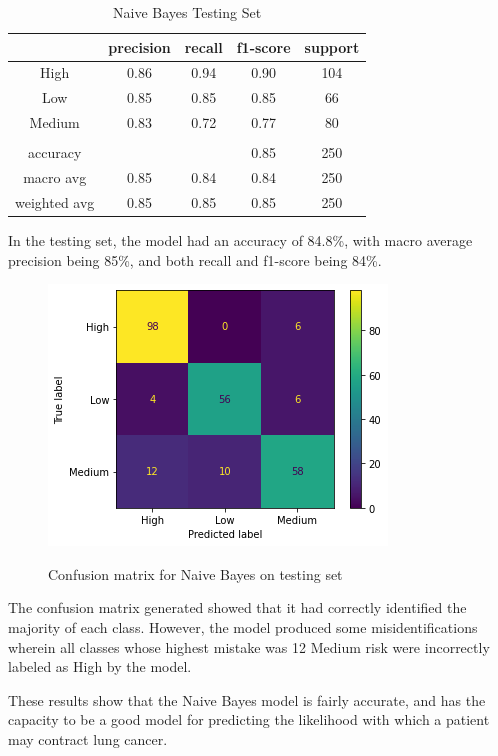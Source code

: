 \documentclass[runningheads]{llncs}
\begin{document}
\begin{table}[ht]
\centering
\caption{Naive Bayes Testing Set} \vspace{0.25em}
\begin{tabular}{|c|c|c|c|c|} \hline
 & precision & recall & f1-score & support \\ \hline
High   & 0.86 & 0.94 & 0.90 & 104 \\ \hline
Low    & 0.85 & 0.85 & 0.85 & 66 \\ \hline
Medium & 0.83 & 0.72 & 0.77 & 80 \\ \hline
& & & & \\ \hline
accuracy     & & & 0.85 & 250 \\ \hline
macro avg    & 0.85 & 0.84 & 0.84 & 250 \\ \hline
weighted avg & 0.85 & 0.85 & 0.85 & 250 \\ \hline
\end{tabular}
\label{tab:naivebayes-testing}
\end{table}

In the testing set, the model had an accuracy of 84.8\%, with macro average precision being 85\%, and both recall and f1-score being 84\%.

\begin{figure}[ht]           	 
\centering               	 
\caption{Confusion matrix for Naive Bayes on testing set}
\includegraphics[scale=0.5]{naivebayes-CM-testing.png}  	 
\label{fig:naivebayes-CM-testing}
\end{figure}

The confusion matrix generated showed that it had correctly identified the majority of each class. However, the model produced some misidentifications wherein all classes whose highest mistake was 12 Medium risk were incorrectly labeled as High by the model. 

These results show that the Naive Bayes model is fairly accurate, and has the capacity to be a good model for predicting the likelihood with which a patient may contract lung cancer.
\end{document}
